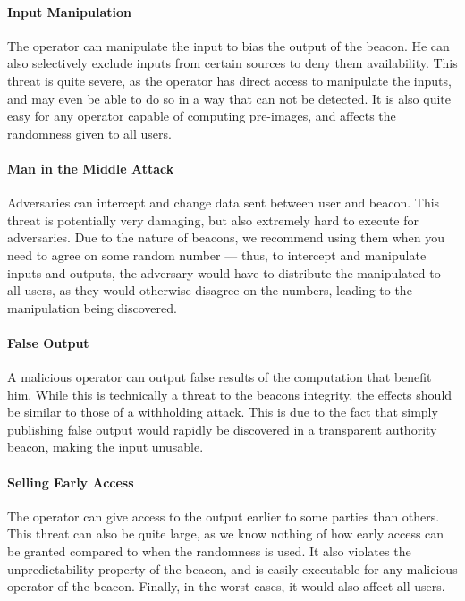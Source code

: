 \paragraph{Input Manipulation} The operator can manipulate the input to bias the output of the beacon. He can also selectively exclude inputs from certain sources to deny them availability. This threat is quite severe, as the operator has direct access to manipulate the inputs, and may even be able to do so in a way that can not be detected. It is also quite easy for any operator capable of computing pre-images, and affects the randomness given to all users.
\paragraph{Man in the Middle Attack} Adversaries can intercept and change data sent between user and beacon. This threat is potentially very damaging, but also extremely hard to execute for adversaries. Due to the nature of beacons, we recommend using them when you need to agree on some random number --- thus, to intercept and manipulate inputs and outputs, the adversary would have to distribute the manipulated to all users, as they would otherwise disagree on the numbers, leading to the manipulation being discovered.
\paragraph{False Output} A malicious operator can output false results of the computation that benefit him. While this is technically a threat to the beacons integrity, the effects should be similar to those of a withholding attack. This is due to the fact that simply publishing false output would rapidly be discovered in a transparent authority beacon, making the input unusable.
\paragraph{Selling Early Access} The operator can give access to the output earlier to some parties than others. This threat can also be quite large, as we know nothing of how early access can be granted compared to when the randomness is used. It also violates the unpredictability property of the beacon, and is easily executable for any malicious operator of the beacon. Finally, in the worst cases, it would also affect all users.
